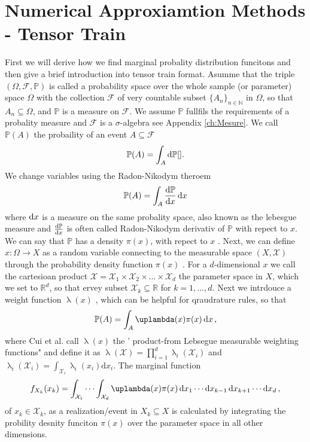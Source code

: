 \section{Numerical Approxiamtion Methods - Tensor Train}
First we will derive how we find marginal probality distribution funcitons and then give a brief introduction into tensor train format.
Asumme that the triple $(\Omega, \mathcal{F} , \mathbb{P})$ is called a probability space over the whole sample (or parameter) space $\Omega$ with the collection $\mathcal{F}$ of very countable subset $\{ A _n \}_{n\in \mathbb{N}}$ in $\Omega$, so that $A_n \subseteq  \Omega$, and $\mathbb{P}$ is a measure on $\mathcal{F}$. 
We assume $\mathbb{P}$ fullfils the requirements of a probality measure and $\mathcal{F}$ is a $\sigma $-algebra see Appendix \ref{ch:Mesure}.
We call $\mathbb{P}(A)$ the probaility of an event $A \subseteq \mathcal{F}$ 
\begin{align}
	\mathbb{P}(A) = \int_A \mathop{}\!\mathrm{d} \mathbb{P} \text{\cite{}}.
\end{align}
We change variables using the Radon-Nikodym theroem \cite{kopp2004measintprob}
\begin{align}
	\mathbb{P}(A) = \int_{A}  \frac{\mathop{}\!\mathrm{d} \mathbb{P}}{\mathop{}\!\mathrm{d} x} \mathop{}\!\mathrm{d} x
\end{align}
where $\mathop{}\!\mathrm{d} x$ is a measure on the same probality space, also known as the lebesgue measure and $\frac{\mathop{}\!\mathrm{d} \mathbb{P}}{\mathop{}\!\mathrm{d} x}$ is often called Radon-Nikodym derivativ of $\mathbb{P}$ with repect to $x$.
We can say that $\mathbb{P}$ has a density $ \pi(x)$, with repect to $x$ \cite[Chapter 10]{simonnet1996measprob}.
Next, we can define $x: \Omega \longrightarrow X$ as a random variable connecting to the measurable space $(X,\mathcal{X})$ through the probability density function $ \pi(x)$ \cite{kopp2004measintprob}.
For a $d$-dimensional $x$ we call the cartesioan product $\mathcal{X} = \mathcal{X}_1 \times \mathcal{X}_2 \times \dots \times \mathcal{X}_d$ the parameter space in $X$, which we set to $\mathbb{R}^d$, so that ervey subset $\mathcal{X}_k \subseteq \mathbb{R}$ for $k = 1, \dots , d$.
Next we intrdouce a weight function $\uplambda(x) $ \cite{davis2007methods}, which can be helpful for qraudrature rules, so that
\begin{align}
	\mathbb{P}(A) = \int_{A} \uplambda(x)   \pi(x) \diff x \, ,
\end{align}
where Cui et al. \cite{cui2022deep} call $\uplambda(x)$ the ' product-from Lebsegue measurable weighting functions" and define it as $\uplambda( \mathcal{X}) = \prod_{i = 1}^{d}  \uplambda_i( \mathcal{X}_i) $ and  $\uplambda_i( \mathcal{X}_i) = \int_{ \mathcal{X}_i} \uplambda_i (x_i) \text{d}x_i$.
The marginal function
\begin{align}
	f_{X_k}(x_k) = \int_{\mathcal{X}_1} \cdots \int_{\mathcal{X}_d} \uplambda(x) \pi(x) \diff x_1 \cdots \diff x_{k-1} \diff x_{k+1} \cdots \diff x_d \, ,
\end{align}
of $x_k \in \mathcal{X}_k$, as a realization/event in $X_k \subseteq X$ is calculated by integrating the probility desnity funciton $\pi(x)$ over the parameter space in all other dimensions.


